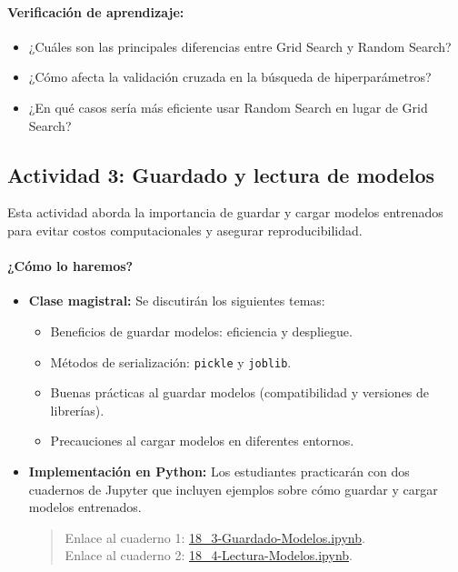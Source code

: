 \documentclass[a4,11pt]{aleph-notas}
\begin{document}
\paragraph{Verificación de aprendizaje:}  
\begin{itemize}[leftmargin=*]
    \item ¿Cuáles son las principales diferencias entre Grid Search y Random Search?
    \item ¿Cómo afecta la validación cruzada en la búsqueda de hiperparámetros?
    \item ¿En qué casos sería más eficiente usar Random Search en lugar de Grid Search?
\end{itemize}

\subsection*{Actividad 3: Guardado y lectura de modelos}

Esta actividad aborda la importancia de guardar y cargar modelos entrenados para evitar costos computacionales y asegurar reproducibilidad. 

\paragraph{¿Cómo lo haremos?}  
\begin{itemize}[leftmargin=*]
    \item \textbf{Clase magistral:} Se discutirán los siguientes temas:
    \begin{itemize}
        \item Beneficios de guardar modelos: eficiencia y despliegue.
        \item Métodos de serialización: \texttt{pickle} y \texttt{joblib}.
        \item Buenas prácticas al guardar modelos (compatibilidad y versiones de librerías).
        \item Precauciones al cargar modelos en diferentes entornos.
    \end{itemize}
    \item \textbf{Implementación en Python:} Los estudiantes practicarán con dos cuadernos de Jupyter que incluyen ejemplos sobre cómo guardar y cargar modelos entrenados.
    \begin{quote}
        Enlace al cuaderno 1: \href{https://colab.research.google.com/github/andres-merino/AprendizajeAutomaticoInicial-05-N0105/blob/main/2-Notebooks/18_3-Guardado-Modelos.ipynb}{18\_3-Guardado-Modelos.ipynb}.\\
        Enlace al cuaderno 2: \href{https://colab.research.google.com/github/andres-merino/AprendizajeAutomaticoInicial-05-N0105/blob/main/2-Notebooks/18_4-Lectura-Modelos.ipynb}{18\_4-Lectura-Modelos.ipynb}.
    \end{quote}
\end{itemize}
\end{document}
